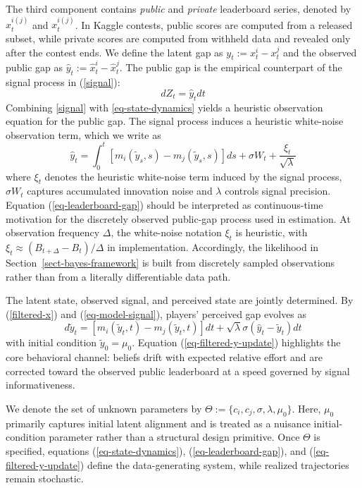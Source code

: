 \documentclass[mnsc]{informs3}
\begin{document}
The third component contains \textit{public} and \textit{private} leaderboard series, denoted by $\hat{x}^{i(j)}_t$ and $x^{i(j)}_t$.
In Kaggle contests, public scores are computed from a released subset, while private scores are computed from withheld data and revealed only after the contest ends.
We define the latent gap as $y_t:=x_t^i-x_t^j$ and the observed public gap as $\hat{y}_t:=\hat{x}_t^i-\hat{x}_t^j$.
The public gap is the empirical counterpart of the signal process in (\ref{signal}):
\begin{equation}\label{eq-model-signal}
dZ_t = \hat{y}_t dt
\end{equation}
Combining \eqref{signal} with \eqref{eq-state-dynamics} yields a heuristic observation equation for the public gap.
The signal process induces a heuristic white-noise observation term, which we write as
\begin{equation}\label{eq-leaderboard-gap}
\hat{y}_t = \int^t_0\left[m_i(\tilde{y}_s, s) - m_j(\tilde{y}_s, s)\right]ds + \sigma W_{t} + \frac{\xi_t}{\sqrt{\lambda}}
\end{equation}
where $\xi_t$ denotes the heuristic white-noise term induced by the signal process, $\sigma W_t$ captures accumulated innovation noise and $\lambda$ controls signal precision.
Equation (\ref{eq-leaderboard-gap}) should be interpreted as continuous-time motivation for the discretely observed public-gap process used in estimation.
At observation frequency $\Delta$, the white-noise notation $\xi_t$ is heuristic, with $\xi_t\approx(B_{t+\Delta}-B_t)/\Delta$ in implementation.
Accordingly, the likelihood in Section~\ref{sect-bayes-framework} is built from discretely sampled observations rather than from a literally differentiable data path.

The latent state, observed signal, and perceived state are jointly determined.
By (\ref{filtered-x}) and (\ref{eq-model-signal}), players’ perceived gap evolves as
\begin{equation}\label{eq-filtered-y-update}
d\tilde{y}_{t} = \left[m_i(\tilde{y}_t, t) - m_j(\tilde{y}_t, t)\right]dt + \sqrt{\lambda}\sigma(\hat{y}_t-\tilde{y}_{t}) dt
\end{equation}
with initial condition $\tilde{y}_0 = \mu_0$.
Equation (\ref{eq-filtered-y-update}) highlights the core behavioral channel: beliefs drift with expected relative effort and are corrected toward the observed public leaderboard at a speed governed by signal informativeness.

We denote the set of unknown parameters by $\Theta := \{c_i, c_j, \sigma, \lambda, \mu_0\}$.
Here, $\mu_0$ primarily captures initial latent alignment and is treated as a nuisance initial-condition parameter rather than a structural design primitive.
Once $\Theta$ is specified, equations (\ref{eq-state-dynamics}), (\ref{eq-leaderboard-gap}), and (\ref{eq-filtered-y-update}) define the data-generating system, while realized trajectories remain stochastic.
\end{document}
